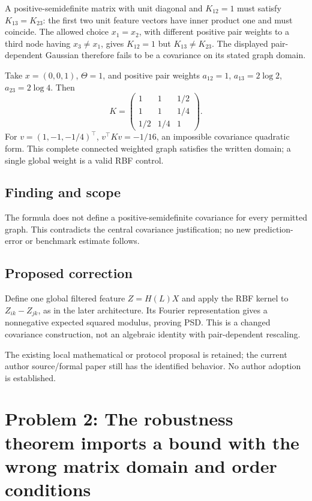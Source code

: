 \documentclass[11pt]{article}
\begin{document}
A positive-semidefinite matrix with unit diagonal and \(K_{12}=1\) must satisfy \(K_{13}=K_{23}\): the first two unit feature vectors have inner product one and must coincide. The allowed choice \(x_1=x_2\), with different positive pair weights to a third node having \(x_3\ne x_1\), gives \(K_{12}=1\) but \(K_{13}\ne K_{23}\). The displayed pair-dependent Gaussian therefore fails to be a covariance on its stated graph domain.

Take \(x=(0,0,1)\), \(\Theta=1\), and positive pair weights \(a_{12}=1\), \(a_{13}=2\log2\), \(a_{23}=2\log4\). Then \[K=\begin{pmatrix}1&1&1/2\\1&1&1/4\\1/2&1/4&1\end{pmatrix}.\] For \(v=(1,-1,-1/4)^\top\), \(v^\top Kv=-1/16\), an impossible covariance quadratic form. This complete connected weighted graph satisfies the written domain; a single global weight is a valid RBF control.

\subsection*{Finding and scope}

The formula does not define a positive-semidefinite covariance for every permitted graph. This contradicts the central covariance justification; no new prediction-error or benchmark estimate follows.

\subsection*{Proposed correction}

Define one global filtered feature \(Z=H(L)X\) and apply the RBF kernel to \(Z_{ik}-Z_{jk}\), as in the later architecture. Its Fourier representation gives a nonnegative expected squared modulus, proving PSD. This is a changed covariance construction, not an algebraic identity with pair-dependent rescaling.

The existing local mathematical or protocol proposal is retained; the current author source/formal paper still has the identified behavior. No author adoption is established.

\section*{Problem 2: The robustness theorem imports a bound with the wrong matrix domain and order conditions}
\end{document}
